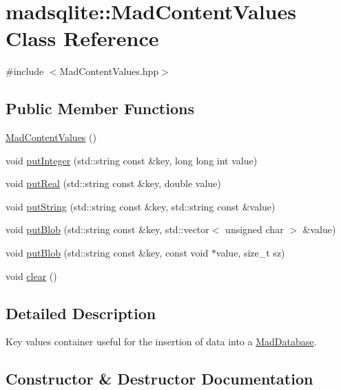 \hypertarget{classmadsqlite_1_1_mad_content_values}{}\section{madsqlite\+:\+:Mad\+Content\+Values Class Reference}
\label{classmadsqlite_1_1_mad_content_values}


{\ttfamily \#include $<$Mad\+Content\+Values.\+hpp$>$}

\subsection*{Public Member Functions}
\begin{DoxyCompactItemize}
\item 
\hyperlink{classmadsqlite_1_1_mad_content_values_aedbfcbdcbef1b45b02f0cc7dbff8d9f8}{Mad\+Content\+Values} ()
\item 
void \hyperlink{classmadsqlite_1_1_mad_content_values_abea262a380af93a516ac1a20c4fdb83b}{put\+Integer} (std\+::string const \&key, long long int value)
\item 
void \hyperlink{classmadsqlite_1_1_mad_content_values_a00a8a96f001511a9201b6b6436ae27b7}{put\+Real} (std\+::string const \&key, double value)
\item 
void \hyperlink{classmadsqlite_1_1_mad_content_values_ab00bdb442e3f04ff4e3dc7e04d5b68dd}{put\+String} (std\+::string const \&key, std\+::string const \&value)
\item 
void \hyperlink{classmadsqlite_1_1_mad_content_values_aa4e03f42e0334133f243b2574f39a826}{put\+Blob} (std\+::string const \&key, std\+::vector$<$ unsigned char $>$ \&value)
\item 
void \hyperlink{classmadsqlite_1_1_mad_content_values_a3b279685249ca9f12f4c1cfb28ed4fae}{put\+Blob} (std\+::string const \&key, const void $\ast$value, size\+\_\+t sz)
\item 
void \hyperlink{classmadsqlite_1_1_mad_content_values_a2415e71ac9c77ca280f9bb8feb433d54}{clear} ()
\end{DoxyCompactItemize}


\subsection{Detailed Description}
Key values container useful for the insertion of data into a \hyperlink{classmadsqlite_1_1_mad_database}{Mad\+Database}. 

\subsection{Constructor \& Destructor Documentation}
\hypertarget{classmadsqlite_1_1_mad_content_values_aedbfcbdcbef1b45b02f0cc7dbff8d9f8}{}\label{classmadsqlite_1_1_mad_content_values_aedbfcbdcbef1b45b02f0cc7dbff8d9f8} 

